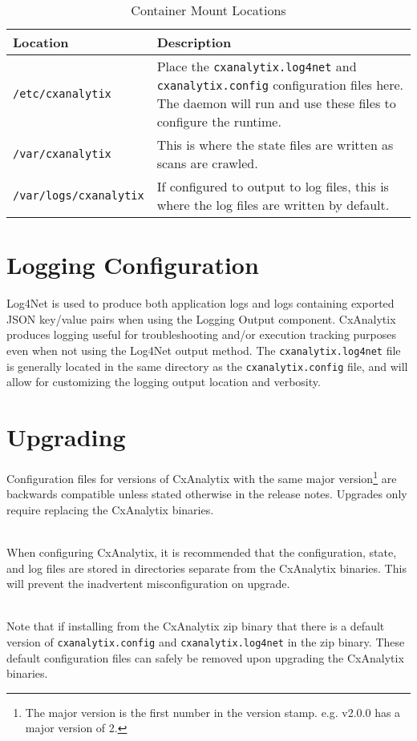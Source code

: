 \begin{table}
    \centering
    \begin{tabular}{|l|l|}
        \toprule
        \textbf{Location} & \textbf{Description}\\
        \midrule
        \verb|/etc/cxanalytix| & \makecell[l]{Place the \texttt{cxanalytix.log4net} and \texttt{cxanalytix.config} configuration files here.
        \\The daemon will run and use these files to configure the runtime.}\\
        \midrule
        \verb|/var/cxanalytix| & This is where the state files are written as scans are crawled.\\
        \midrule
        \verb|/var/logs/cxanalytix| & If configured to output to log files, this is where the log files are written by default.\\
        \bottomrule
    \end{tabular}
    \caption{Container Mount Locations}
    \label{tab:mounts}
\end{table}


\section{Logging Configuration}

Log4Net is used to produce both application logs and logs containing exported JSON key/value pairs when using the Logging Output component. 
CxAnalytix produces logging useful for troubleshooting and/or execution tracking purposes even when not using the Log4Net output method.  The 
\texttt{cxanalytix.log4net} file is generally located in the same directory as the \texttt{cxanalytix.config} file, and will allow for
customizing the logging output location and verbosity.



\section{Upgrading}

Configuration files for versions of CxAnalytix with the same major version\footnote{The major version is the first 
number in the version stamp.  e.g. v2.0.0 has a major version of 2.} are backwards compatible unless stated otherwise 
in the release notes.  Upgrades only require replacing the CxAnalytix binaries.

\noindent\\When configuring CxAnalytix, it is recommended that the configuration, state, and log files are stored
in directories separate from the CxAnalytix binaries.  This will prevent the inadvertent misconfiguration on upgrade.


\noindent\\Note that if installing from the CxAnalytix zip binary that there is a default version of \texttt{cxanalytix.config}
and \texttt{cxanalytix.log4net} in the zip binary.  These default configuration files can safely be removed upon
upgrading the CxAnalytix binaries.
